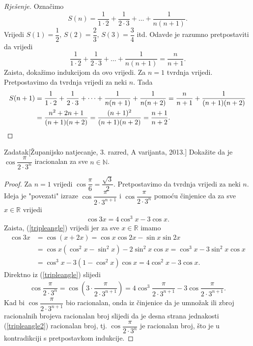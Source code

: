 \begin{proof}[Rješenje]
Označimo
\[S(n)=\dfrac{1}{1\cdot 2}+\dfrac{1}{2\cdot 3}+\dots+\dfrac{1}{n(n+1)}.\]
Vrijedi \(S(1)=\dfrac{1}{2}\), \(S(2)=\dfrac{2}{3}\), \(S(3)=\dfrac{3}{4}\) itd. Odavde je razumno pretpostaviti da vrijedi
\[\dfrac{1}{1\cdot 2}+\dfrac{1}{2\cdot 3}+\dots+\dfrac{1}{n(n+1)}=\dfrac{n}{n+1}.\]
Zaista, dokažimo indukcijom da ovo vrijedi. Za \(n=1\) tvrdnja vrijedi. Pretpostavimo da tvrdnja vrijedi za neki \(n\). Tada
\begin{align*}
S(n+1)&=\dfrac{1}{1\cdot 2}+\dfrac{1}{2\cdot 3}+\dots+\dfrac{1}{n(n+1)}+\dfrac{1}{n(n+2)}=\dfrac{n}{n+1}+\dfrac{1}{(n+1)(n+2)}\\
&=\dfrac{n^2+2n+1}{(n+1)(n+2)}=\dfrac{(n+1)^2}{(n+1)(n+2)}=\dfrac{n+1}{n+2}.
\qedhere
\end{align*}
\end{proof}
\begin{exercise}{Zadatak}[Županijsko natjecanje, 3. razred, A varijanta, 2013.] Dokažite da je \(\cos{\dfrac{\pi}{2\cdot 3^n}}\) iracionalan za sve \(n\in \mathbb{N}\).
\end{exercise}
\begin{proof}
Za \(n=1\) vrijedi \(\cos{\dfrac{\pi}{6}}=\dfrac{\sqrt{3}}{2}\). Pretpostavimo da tvrdnja vrijedi za neki \(n\). Ideja je "povezati" izraze \(\cos{\dfrac{\pi}{2\cdot 3^{n+1}}}\) i \(\cos{\dfrac{\pi}{2\cdot 3^{n}}}\) pomoću činjenice da za sve \(x\in \mathbb{R}\) vrijedi
\begin{align}
\label{tripleangle}
\cos{3x}=4\cos^3{x}-3\cos{x}.
\end{align}
Zaista, (\ref{tripleangle}) vrijedi jer za sve \(x\in \mathbb{R}\) imamo
\begin{align*}
\cos{3x}&=\cos(x+2x)=\cos{x}\cos{2x}-\sin{x}\sin{2x}\\
&=\cos{x}\left(\cos^2{x}-\sin^2{x}\right)-2\sin^2{x}\cos{x}=\cos^3{x}-3\sin^2{x}\cos{x}\\
&=\cos^3x-3(1-\cos^2{x})\cos{x}=4\cos^2{x}-3\cos{x}.
\end{align*}
Direktno iz (\ref{tripleangle}) slijedi
\begin{align}
\label{tripleangle2}
\cos{\dfrac{\pi}{2\cdot 3^{n}}}=\cos\left(3\cdot \dfrac{\pi}{2\cdot 3^{n+1}}\right)=4\cos^3{\dfrac{\pi}{2\cdot 3^{n+1}}}-3\cos{\dfrac{\pi}{2\cdot 3^{n+1}}}.
\end{align}
Kad bi \(\cos{\dfrac{\pi}{2\cdot 3^{n+1}}}\) bio racionalan, onda iz činjenice da je umnožak ili zbroj racionalnih brojeva racionalan broj slijedi da je desna strana jednakosti (\ref{tripleangle2}) racionalan broj, tj. \(\cos{\dfrac{\pi}{2\cdot 3^{n}}}\) je racionalan broj, što je u kontradikciji s pretpostavkom indukcije.
\end{proof}
